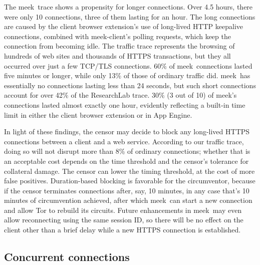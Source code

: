 \documentclass[conference]{IEEEtran}
\newcommand{\meekclient}{\mbox{meek-client}\xspace}
\newcommand{\meek}{meek\xspace}
\newcommand{\lbl}{ResearchLab\xspace}
\begin{document}
The \meek\ trace shows a propensity for longer connections.
Over 4.5 hours, there were only 10 connections,
three of them lasting for an hour.
The long connections are caused by the client browser extension's
use of long-lived HTTP keepalive connections,
combined with \meekclient's polling requests,
which keep the connection from becoming idle.
The traffic trace represents the browsing of hundreds of web sites
and thousands of HTTPS transactions, but they all
occurred over just a few TCP/TLS connections.
60\% of \meek\ connections lasted five minutes or longer,
while only 13\% of those of ordinary traffic did.
\meek\ has essentially no connections lasting less than 24 seconds,
but such short connections account for over 42\% of the \lbl trace.
30\% (3 out of 10) of \meek's connections lasted almost exactly one hour,
evidently reflecting a built-in time limit in either the client browser extension
or in App Engine.

In light of these findings,
the censor may decide to block any long-lived HTTPS connections between
a client and a web service.
According to our traffic trace, doing so will not disrupt more than 8\% of ordinary connections;
whether that is an acceptable cost depends on the time threshold and the censor's
tolerance for collateral damage.
The censor can lower the timing threshold, at the cost of more false positives.
Duration-based blocking is favorable for the circumventor,
because if the censor terminates connections after, say, 10 minutes,
in any case that's 10 minutes of circumvention achieved,
after which \meek\ can start a new connection
and allow Tor to rebuild its circuits.
Future enhancements in \meek\ may even allow reconnecting using the same session ID,
so there will be no effect on the client other than a brief delay
while a new HTTPS connection is established.


\subsection{Concurrent connections}

\end{document}

